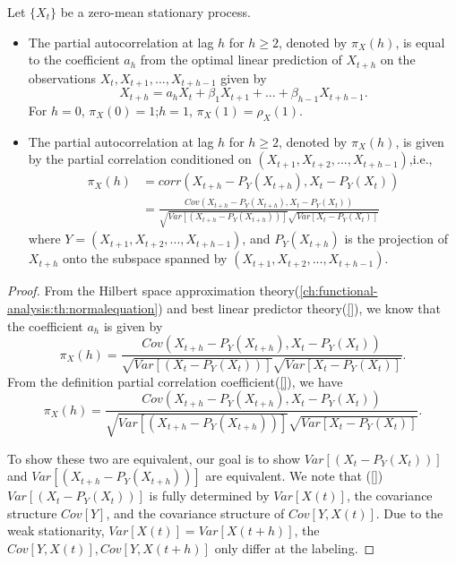 \begin{theorem}\label{ch:time-series-analysis:th:ComputePACFViaLinearRegression}
	Let $\{X_t\}$ be a zero-mean stationary process.
\begin{itemize}
	\item The partial autocorrelation at lag $h$ for $h\geq 2$, denoted by $\pi_X(h)$, is equal to the coefficient $a_h$ from the optimal linear prediction of $X_{t+h}$ on the observations $X_{t}, X_{t+1},...,X_{t+h-1}$ given by
	$$X_{t+h} = a_h X_t + \beta_1 X_{t+1} + ... + \beta_{h-1} X_{t+h-1}.$$
	For $h=0$, $\pi_X(0) = 1$;$h = 1$, $\pi_X(1) = \rho_X(1)$.
	\item The partial autocorrelation at lag $h$ for $h\geq 2$, denoted by $\pi_X(h)$, is given by the partial correlation conditioned on $(X_{t+1},X_{t+2},...,X_{t+h-1})$,i.e.,
	\begin{align*}
	\pi_X(h) &= corr(X_{t+h} - P_Y(X_{t+h}),X_t - P_Y(X_{t})) \\
	&= \frac{Cov(X_{t+h} - P_Y(X_{t+h}),X_t - P_Y(X_{t}))}{\sqrt{Var[(X_{t+h} - P_Y(X_{t+h}))]}\sqrt{Var[X_t - P_Y(X_{t})]}}
	\end{align*}
where $Y = (X_{t+1},X_{t+2},...,X_{t+h-1})$, and $P_Y(X_{t+h})$ is the projection of $X_{t+h}$ onto the subspace spanned by $(X_{t+1},X_{t+2},...,X_{t+h-1})$.	
\end{itemize}	
\end{theorem}
\begin{proof}
From the Hilbert space approximation theory(\autoref{ch:functional-analysis:th:normalequation}) and best linear predictor theory(\autoref{}), we know that the coefficient $a_h$ is given by
$$\pi_X(h) = \frac{Cov(X_{t+h} - P_Y(X_{t+h}),X_t - P_Y(X_{t}))}{\sqrt{Var[(X_{t} - P_Y(X_{t}))]}\sqrt{Var[X_t - P_Y(X_{t})]}}.$$
From the definition partial correlation coefficient(\autoref{}), we have
$$	\pi_X(h) = \frac{Cov(X_{t+h} - P_Y(X_{t+h}),X_t - P_Y(X_{t}))}{\sqrt{Var[(X_{t+h} - P_Y(X_{t+h}))]}\sqrt{Var[X_t - P_Y(X_{t})]}}.$$

To show these two are equivalent, our goal is to show
$Var[(X_{t} - P_Y(X_{t}))]$
and $Var[(X_{t+h} - P_Y(X_{t+h}))]$
are equivalent. We note that (\autoref{}) $Var[(X_{t} - P_Y(X_{t}))]$ is fully determined by $Var[X(t)]$, the covariance structure $Cov[Y]$, and the covariance structure of $Cov[Y,X(t)]$. Due to the weak stationarity, $Var[X(t)] = Var[X(t+h)]$, the $Cov[Y,X(t)], Cov[Y,X(t+h)]$ only differ at the labeling. 
\end{proof}


